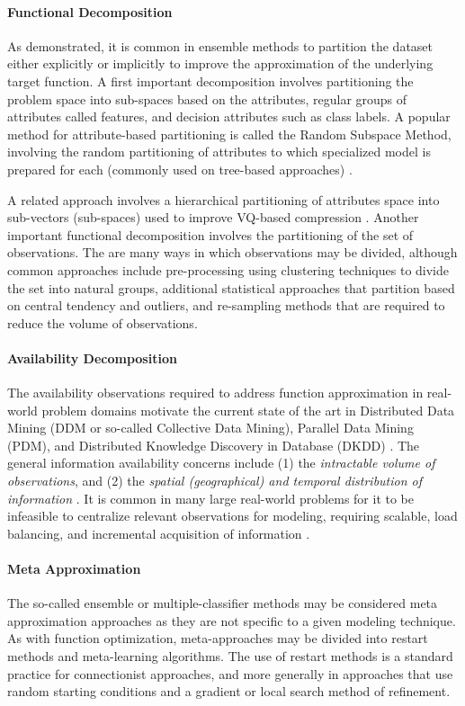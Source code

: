 \paragraph{Functional Decomposition}
As demonstrated, it is common in ensemble methods to partition the dataset either explicitly or implicitly to improve the approximation of the underlying target function. A first important decomposition involves partitioning the problem space into sub-spaces based on the attributes, regular groups of attributes called features, and decision attributes such as class labels. A popular method for attribute-based partitioning is called the Random Subspace Method, involving the random partitioning of attributes to which specialized model is prepared for each (commonly used on tree-based approaches) \cite{Ho1998}. 

A related approach involves a hierarchical partitioning of attributes space into sub-vectors (sub-spaces) used to improve VQ-based compression \cite{Gersho1984}. Another important functional decomposition involves the partitioning of the set of observations. The are many ways in which observations may be divided, although common approaches include pre-processing using clustering techniques to divide the set into natural groups, additional statistical approaches that partition based on central tendency and outliers, and re-sampling methods that are required to reduce the volume of observations.
	
\paragraph{Availability Decomposition}
The availability observations required to address function approximation in real-world problem domains motivate the current state of the art in Distributed Data Mining (DDM or so-called Collective Data Mining), Parallel Data Mining (PDM), and Distributed Knowledge Discovery in Database (DKDD) \cite{Kargupta2000}. The general information availability concerns include (1) the \emph{intractable volume of observations}, and (2) the \emph{spatial (geographical) and temporal distribution of information} \cite{Zaki1999}. It is common in many large real-world problems for it to be infeasible to centralize relevant observations for modeling, requiring scalable, load balancing, and incremental acquisition of information \cite{Skillicorn1999}. 
	
\paragraph{Meta Approximation}
The so-called ensemble or multiple-classifier methods may be considered meta approximation approaches as they are not specific to a given modeling technique. As with function optimization, meta-approaches may be divided into restart methods and meta-learning algorithms. The use of restart methods is a standard practice for connectionist approaches, and more generally in approaches that use random starting conditions and a gradient or local search method of refinement. 

